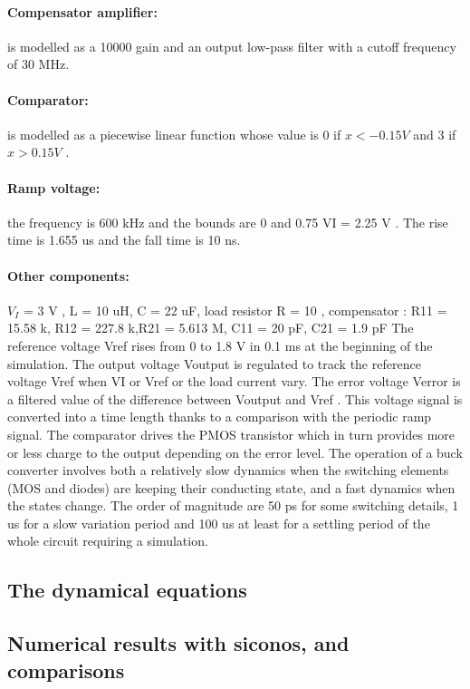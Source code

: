 \documentclass{article}
\begin{document}
\paragraph{Compensator amplifier:} is modelled as a 10000 gain and an output low-pass
filter with a cutoff frequency of 30 MHz.
\paragraph{Comparator:} is modelled as a piecewise linear function whose value is 0 if
$x < -0.15V$ and 3 if $x > 0.15V$ .
\paragraph{Ramp voltage:} the frequency is 600 kHz and the bounds are 0 and 0.75 VI = 2.25 V .
The rise time is 1.655 us and the fall time is 10 ns.
\paragraph{Other components:} $V_I$ = 3 V , L = 10 uH, C = 22 uF, load resistor R = 10 , compensator
: R11 = 15.58 k, R12 = 227.8 k,R21 = 5.613 M, C11 = 20 pF, C21 = 1.9 pF
The reference voltage Vref rises from 0 to 1.8 V in 0.1 ms at the beginning
of the simulation.
The output voltage Voutput is regulated to track the reference voltage Vref when
VI or Vref or the load current vary. The error voltage Verror is a filtered value
of the difference between Voutput and Vref . This voltage signal is converted
into a time length thanks to a comparison with the periodic ramp signal. The
comparator drives the PMOS transistor which in turn provides more or less
charge to the output depending on the error level. The operation of a buck
converter involves both a relatively slow dynamics when the switching elements
(MOS and diodes) are keeping their conducting state, and a fast dynamics when
the states change. The order of magnitude are 50 ps for some switching details,
1 us for a slow variation period and 100 us at least for a settling period of the
whole circuit requiring a simulation.
\subsection{The dynamical equations}
\label{section41}


\subsection{Numerical results with {\sc siconos},  and comparisons}
\label{section42}
\end{document}
